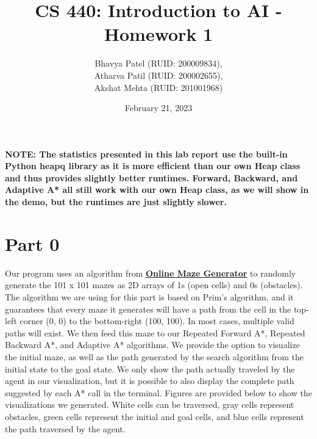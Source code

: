 \documentclass[12pt, letterpaper]{article}
\title{ CS 440: Introduction to AI - Homework 1}
\author{Bhavya Patel (RUID: 200009834), \\Atharva Patil (RUID: 200002655), \\Akshat Mehta (RUID: 201001968)}
\date{February 21, 2023}
\begin{document}
\maketitle

\textbf{NOTE: The statistics presented in this lab report use the built-in Python heapq library as it is more efficient than our own Heap class and thus provides slightly better runtimes. Forward, Backward, and Adaptive A* all still work with our own Heap class, as we will show in the demo, but the runtimes are just slightly slower.}
\\
\section*{Part 0}
Our program uses an algorithm from \textbf{\href{https://edtg.co.uk/2020/04/16/procedural-maze-generator-using-python/}{Online Maze Generator}} to randomly generate the 101 x 101 mazes as 2D arrays of 1s (open cells) and 0s (obstacles). The algorithm we are using for this part is based on Prim’s algorithm, and it guarantees that every maze it generates will have a path from the cell in the top-left corner (0, 0) to the bottom-right (100, 100). In most cases, multiple valid paths will exist. We then feed this maze to our Repeated Forward A*, Repeated Backward A*, and Adaptive A* algorithms. We provide the option to visualize the initial maze, as well as the path generated by the search algorithm from the initial state to the goal state. We only show the path actually traveled by the agent in our visualization, but it is possible to also display the complete path suggested by each A* call in the terminal. Figures are provided below to show the visualizations we generated. White cells can be traversed, gray cells represent obstacles, green cells represent the initial and goal cells, and blue cells represent the path traversed by the agent.
\end{document}
